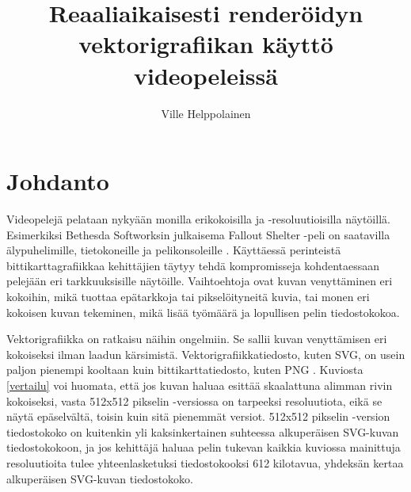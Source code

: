 \documentclass[utf8,bachelor]{gradu3}
\begin{document}
\title{Reaaliaikaisesti renderöidyn vektorigrafiikan käyttö videopeleissä}


\author{Ville Helppolainen}

\maketitle

\mainmatter


\chapter{Johdanto}

Videopelejä pelataan nykyään monilla erikokoisilla ja -resoluutioisilla näytöillä. Esimerkiksi Bethesda Softworksin julkaisema Fallout Shelter -peli on saatavilla älypuhelimille, tietokoneille ja pelikonsoleille \parencite{RefWorks:doc:5bd6d887e4b0a1f99c62e6de}. Käyttäessä perinteistä bittikarttagrafiikkaa kehittäjien täytyy tehdä kompromisseja kohdentaessaan pelejään eri tarkkuuksisille näytöille. Vaihtoehtoja ovat kuvan venyttäminen eri kokoihin, mikä tuottaa epätarkkoja tai pikselöityneitä kuvia, tai monen eri kokoisen kuvan tekeminen, mikä lisää työmäärä ja lopullisen pelin tiedostokokoa. \parencite{RefWorks:doc:5bd8319de4b03ae5c9b276b8}

Vektorigrafiikka on ratkaisu näihin ongelmiin. Se sallii kuvan venyttämisen eri kokoiseksi ilman laadun kärsimistä. Vektorigrafiikkatiedosto, kuten SVG, on usein paljon pienempi kooltaan kuin bittikarttatiedosto, kuten PNG \parencites{RefWorks:doc:5bdc5224e4b05afcfde5b159}{RefWorks:doc:5bdc5292e4b05afcfde5b171}. Kuviosta \ref{vertailu} voi huomata, että jos kuvan haluaa esittää skaalattuna alimman rivin kokoiseksi, vasta 512x512 pikselin -versiossa on tarpeeksi resoluutiota, eikä se näytä epäselvältä, toisin kuin sitä pienemmät versiot. 512x512 pikselin -version tiedostokoko on kuitenkin yli kaksinkertainen suhteessa alkuperäisen SVG-kuvan tiedostokokoon, ja jos kehittäjä haluaa pelin tukevan kaikkia kuviossa mainittuja resoluutioita tulee yhteenlasketuksi tiedostokooksi 612 kilotavua, yhdeksän kertaa alkuperäisen SVG-kuvan tiedostokoko.
\end{document}
